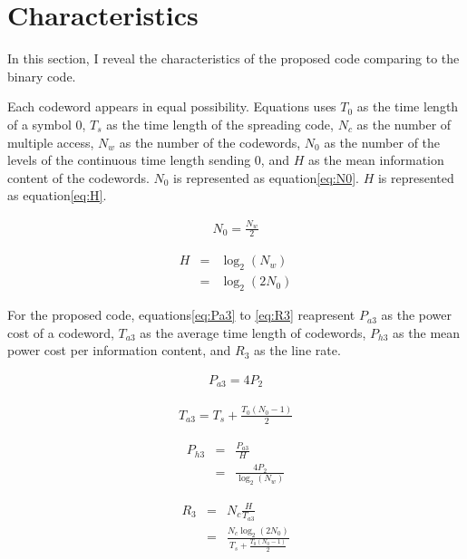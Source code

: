\documentclass[dvipdfmx]{article}
\begin{document}
\section{Characteristics}
In this section, I reveal the characteristics of the proposed code comparing to the binary code.

Each codeword appears in equal possibility.
Equations uses
 $T_{0}$ as the time length of a symbol $0$,
 $T_{s}$ as the time length of the spreading code,
 $N_{c}$ as the number of multiple access,
 $N_{w}$ as the number of the codewords,
 $N_{0}$ as the number of the levels of the continuous time length sending $0$,
 and $H$ as the mean information content of the codewords.
$N_{0}$ is represented as equation\ref{eq:N0}.
$H$ is represented as equation\ref{eq:H}.

\begin{eqnarray}
	N_{0} = \frac{N_{w}}{2}
	\label{eq:N0}
\end{eqnarray}

\begin{eqnarray}
    H &=& \log_2(N_{w}) \nonumber \\
      &=& \log_2(2N_{0})
    \label{eq:H}
\end{eqnarray}

For the proposed code, equations\ref{eq:Pa3} to \ref{eq:R3} reapresent
 $P_{a3}$ as the power cost of a codeword,
 $T_{a3}$ as the average time length of codewords,
 $P_{h3}$ as the mean power cost per information content,
 and $R_{3}$ as the line rate.

\begin{eqnarray}
    P_{a3} = 4P_{2}
    \label{eq:Pa3}
\end{eqnarray}

\begin{eqnarray}
    T_{a3} = T_{s} + \frac{T_{0}(N_{0}-1)}{2}
    \label{eq:Ta3}
\end{eqnarray}

\begin{eqnarray}
    P_{h3} &=& \frac{P_{a3}}{H} \nonumber \\
    	&=& \frac{4P_{2}}{\log_2(N_{w})}
    \label{eq:Ph3}
\end{eqnarray}

\begin{eqnarray}
    R_{3} &=& N_{c} \frac{H}{T_{a3}} \nonumber \\
      &=& \frac{ N_{c}\log_2(2N_{0}) }{ T_{s}+\frac{T_{0}(N_{0}-1)}{2} }
    \label{eq:R3}
\end{eqnarray}
\end{document}
